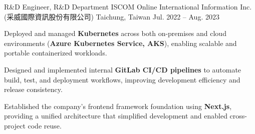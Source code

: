 

\begin{cventries}

  \cventry
    {R\&D Engineer, R\&D Department} %
    {ISCOM Online International Information Inc. (采威國際資訊股份有限公司)} %
    {Taichung, Taiwan} %
    {Jul. 2022 -- Aug. 2023} %
    {
      \begin{cvitems}
        \item {Deployed and managed \textbf{Kubernetes} across both on-premises and cloud environments (\textbf{Azure Kubernetes Service, AKS}), enabling scalable and portable containerized workloads.}
        \item {Designed and implemented internal \textbf{GitLab CI/CD pipelines} to automate build, test, and deployment workflows, improving development efficiency and release consistency.}
        \item {Established the company's frontend framework foundation using \textbf{Next.js}, providing a unified architecture that simplified development and enabled cross-project code reuse.}
      \end{cvitems}
    }


\end{cventries}
